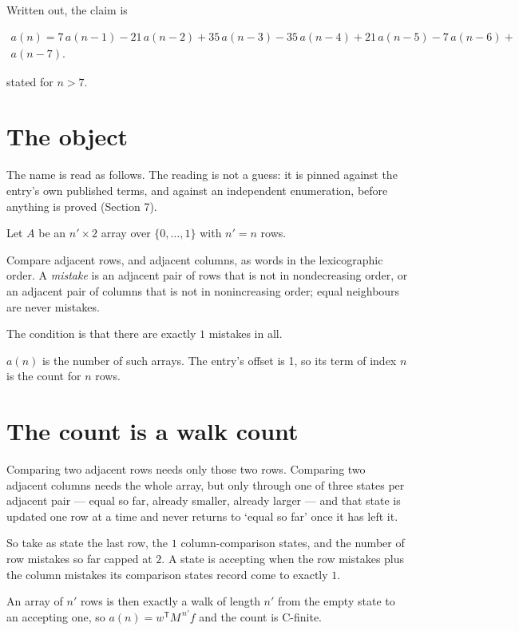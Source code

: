\documentclass[11pt]{article}
\theoremstyle{definition}
\begin{document}
Written out, the claim is

\begin{multline*} a(n) = 7\,a(n-1) - 21\,a(n-2) + 35\,a(n-3) - 35\,a(n-4) + 21\,a(n-5) - 7\,a(n-6) + \\ a(n-7). \end{multline*}

stated for $n > 7$.

\section{The object}

The name is read as follows. The reading is not a guess: it is pinned against the entry's own published terms, and against an independent enumeration, before anything is proved (Section 7).

Let $A$ be an $n' \times 2$ array over $\{0,\dots,1\}$ with $n' = n$ rows.

Compare adjacent rows, and adjacent columns, as words in the lexicographic order. A {\itshape mistake} is an adjacent pair of rows that is not in nondecreasing order, or an adjacent pair of columns that is not in nonincreasing order; equal neighbours are never mistakes.

The condition is that there are exactly $1$ mistakes in all.

$a(n)$ is the number of such arrays. The entry's offset is 1, so its term of index $n$ is the count for $n$ rows.

\section{The count is a walk count}

Comparing two adjacent rows needs only those two rows. Comparing two adjacent columns needs the whole array, but only through one of three states per adjacent pair --- equal so far, already smaller, already larger --- and that state is updated one row at a time and never returns to `equal so far' once it has left it.

So take as state the last row, the $1$ column-comparison states, and the number of row mistakes so far capped at $2$. A state is accepting when the row mistakes plus the column mistakes its comparison states record come to exactly $1$.

An array of $n'$ rows is then exactly a walk of length $n'$ from the empty state to an accepting one, so $a(n) = w^{\mathsf T}M^{\,n'}f$ and the count is C-finite.
\end{document}
